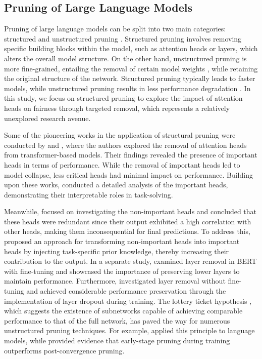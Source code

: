 \documentclass[letterpaper]{article} %
\newcommand{\goncalo}[1]
{\textcolor{orange}{{\bf}{\em #1}{\bf}}}
\begin{document}
\subsection{Pruning of Large Language Models}
Pruning of large language models can be split into two main categories: structured and unstructured pruning \cite{behnke2021pruning}. Structured pruning involves removing specific building blocks within the model, such as attention heads or layers, which alters the overall model structure. On the other hand, unstructured pruning is more fine-grained, entailing the removal of certain model weights  \cite{narang2017exploring,h.2018to}, while retaining the original structure of the network. Structured pruning typically leads to faster models, while unstructured pruning results in less performance degradation \cite{behnke2021pruning}. In this study, we focus on structured pruning to explore the impact of attention heads on fairness through targeted removal, which represents a relatively unexplored research avenue.
 
Some of the pioneering works in the application of structural pruning were conducted by \citet{voita-etal-2019-analyzing} and \citet{NEURIPS2019_2c601ad9}, where the authors explored the removal of attention heads from transformer-based models. Their findings revealed the presence of important heads in terms of performance. While the removal of important heads led to model collapse, less critical heads had minimal impact on performance. Building upon these works, \citet{he-choi-2021-stem} conducted a detailed analysis of the important heads, demonstrating their interpretable roles in task-solving. 

Meanwhile, \citet{bian-etal-2021-attention} focused on investigating the non-important heads and concluded that these heads were redundant since their output exhibited a high correlation with other heads, making them inconsequential for final predictions. To address this, \citet{zhang-etal-2021-enlivening} proposed an approach for transforming non-important heads into important heads by injecting task-specific prior knowledge, thereby increasing their contribution to the output. In a separate study, \citet{sajjad2023effect} examined layer removal in BERT  \cite{devlin2018bert} with fine-tuning and showcased the importance of preserving lower layers to maintain performance. Furthermore, \citet{Fan2020Reducing} investigated layer removal without fine-tuning and achieved considerable performance preservation through the implementation of layer dropout during training. The lottery ticket hypothesis \cite{frankle2018the}, which suggests the existence of subnetworks capable of achieving comparable performance to that of the full network, has paved the way for numerous unstructured pruning techniques. For example, \citet{behnke-heafield-2020-losing} applied this principle to language models, while \citet{prasanna-etal-2020-bert} provided evidence that early-stage pruning during training outperforms post-convergence pruning.
\end{document}
